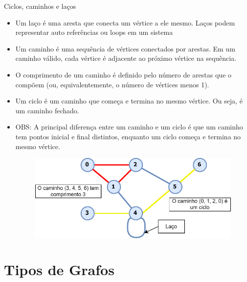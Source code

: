 \documentclass{if-beamer}
\begin{document}
\begin{frame}{Ciclos, caminhos e laços} 
\begin{itemize}
\justifying
\item Um laço é uma aresta que conecta um vértice a ele mesmo. Laços podem representar auto referências ou loops em um sistema

\item Um caminho é uma sequência de vértices conectados por arestas. Em um caminho válido, cada vértice é adjacente ao próximo vértice na sequência.

\item O comprimento de um caminho é definido pelo número de arestas que o compõem (ou, equivalentemente, o número de vértices menos 1).

\item Um ciclo é um caminho que começa e termina no mesmo vértice. Ou seja, é um caminho fechado.

\item OBS: A principal diferença entre um caminho e um ciclo é que um caminho tem pontos inicial e final distintos, enquanto um ciclo começa e termina no mesmo vértice.

\begin{figure}
  \centering
  \includegraphics[scale=0.80]{Figuras/exemplos-grafo/k_svg-tex.pdf}
\end{figure}

\end{itemize} 
\end{frame}

\section{Tipos de Grafos}
\end{document}
